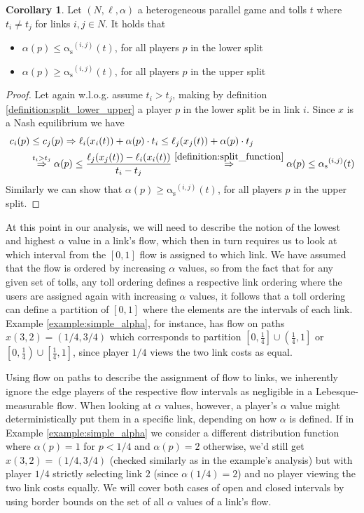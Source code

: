 \documentclass[10pt,a4paper]{book}
\newcommand{\RightarrowArg}[1]{\stackrel{#1}{\Rightarrow}}
\newcommand{\as}{\mathrm{\alpha_s}}
\theoremstyle{definition}
\newtheorem{corollary}[definition]{Corollary}
\theoremstyle{comment}
\begin{document}
\begin{corollary}
	\label{corollary:split_to_alpha}
	Let $(N, \ell, \alpha)$ a heterogeneous parallel game and tolls $t$ where $t_i \ne t_j$ for links $i, j \in N$.
	It holds that
	\begin{itemize}
		\item $\alpha(p) \le \as^{(i, j)}(t)$, for all players $p$ in the lower split
		\item $\alpha(p) \ge \as^{(i, j)}(t)$, for all players $p$ in the upper split
	\end{itemize}
\end{corollary}

\begin{proof}
	Let again w.l.o.g. assume $t_i > t_j$, making by definition \ref{definition:split_lower_upper} a player $p$ in the lower split be in link $i$.
	Since $x$ is a Nash equilibrium we have
	\begin{align*}
		c_i(p) &\le c_j(p) \Rightarrow \ell_i(x_i(t)) + \alpha(p) \cdot t_i \le \ell_j(x_j(t)) + \alpha(p) \cdot t_j \\
		&\RightarrowArg{t_i > t_j} \alpha(p) \le \frac{\ell_j(x_j(t)) - \ell_i(x_i(t))}{t_i - t_j} \RightarrowArg{\ref{definition:split_function}} \alpha(p) \le \as^{(i, j)}(t)
	\end{align*}
	Similarly we can show that $\alpha(p) \ge \as^{(i, j)}(t)$, for all players $p$ in the upper split.
\end{proof}

At this point in our analysis, we will need to describe the notion of the lowest and highest $\alpha$ value in a link's flow, which then in turn requires us to look at which interval from the $[0, 1]$ flow is assigned to which link.
We have assumed that the flow is ordered by increasing $\alpha$ values, so from the fact that for any given set of tolls, any toll ordering defines a respective link ordering where the users are assigned again with increasing $\alpha$ values, it follows that a toll ordering can define a partition of $[0, 1]$ where the elements are the intervals of each link.
Example \ref{example:simple_alpha}, for instance, has flow on paths $x(3, 2) = (1/4, 3/4)$ which corresponds to partition $\left[0, \tfrac14\right] \cup \left(\tfrac14, 1\right]$ or $\left[0, \tfrac14\right) \cup \left[\tfrac14, 1\right]$, since player $1/4$ views the two link costs as equal.

Using flow on paths to describe the assignment of flow to links, we inherently ignore the edge players of the respective flow intervals as negligible in a Lebesque-measurable flow.
When looking at $\alpha$ values, however, a player's $\alpha$ value might deterministically put them in a specific link, depending on how $\alpha$ is defined.
If in Example \ref{example:simple_alpha} we consider a different distribution function where $\alpha(p) = 1$ for $p < 1/4$ and $\alpha(p) = 2$ otherwise, we'd still get $x(3, 2) = (1/4, 3/4)$ (checked similarly as in the example's analysis) but with player $1/4$ strictly selecting link $2$ (since $\alpha(1/4) = 2$) and no player viewing the two link costs equally.
We will cover both cases of open and closed intervals by using border bounds on the set of all $\alpha$ values of a link's flow.
\end{document}
